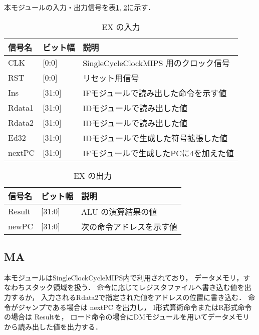 本モジュールの入力・出力信号を表\ref{tab:ex_input}, \ref{tab:ex_output}に示す．
\begin{table}[h]
  \caption{EX の入力}
  \centering
  \begin{tabular}{l|l|l}
    信号名 & ビット幅 & 説明 \\
    \hline
    CLK & [0:0] & SingleCycleClockMIPS 用のクロック信号 \\
    RST & [0:0] & リセット用信号 \\
    Ins & [31:0] & IFモジュールで読み出した命令を示す値 \\
    Rdata1 & [31:0] & IDモジュールで読み出した値 \\
    Rdata2 & [31:0] & IDモジュールで読み出した値 \\
    Ed32 & [31:0] & IDモジュールで生成した符号拡張した値 \\
    nextPC & [31:0] & IFモジュールで生成したPCに4を加えた値 \\
  \end{tabular}
  \label{tab:ex_input}
\end{table}
\begin{table}[h]
  \caption{EX の出力}
  \centering
  \begin{tabular}{l|l|l}
    信号名 & ビット幅 & 説明 \\
    \hline
    Result & [31:0] & ALU の演算結果の値 \\
    newPC & [31:0] & 次の命令アドレスを示す値 \\
  \end{tabular}
  \label{tab:ex_output}
\end{table}

\subsection{MA}
本モジュールはSingleClockCycleMIPS内で利用されており，
データメモリ，すなわちスタック領域を扱う．
命令に応じてレジスタファイルへ書き込む値を出力するか，
入力されるRdata2で指定された値をアドレスの位置に書き込む．
命令がジャンプである場合は nextPC を出力し，
I形式算術命令またはR形式命令の場合は Resultを，
ロード命令の場合にDMモジュールを用いてデータメモリから読み出した値を出力する．

